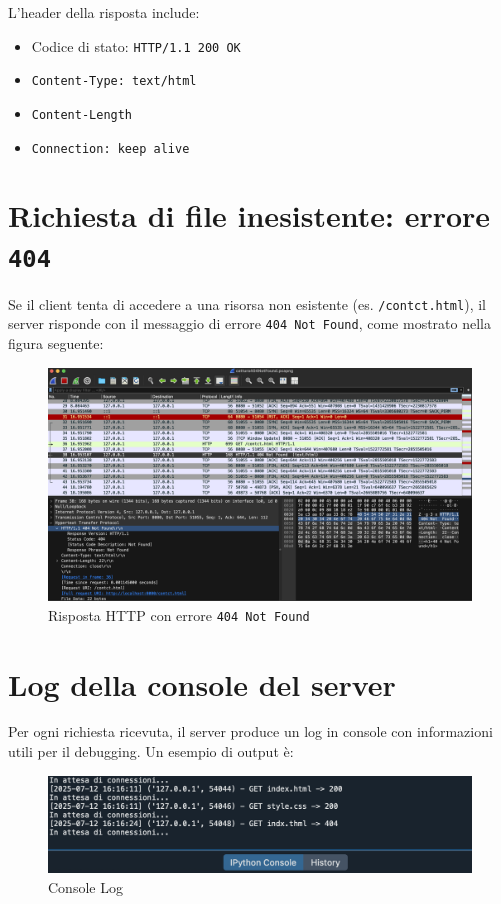 \documentclass[a4paper,12pt]{report}
\begin{document}
L’header della risposta include:
\begin{itemize}
    \item Codice di stato: \texttt{HTTP/1.1 200 OK}
    \item \texttt{Content-Type: text/html}
    \item \texttt{Content-Length}
    \item \texttt{Connection: keep alive}
\end{itemize}

\section{Richiesta di file inesistente: errore \texttt{404}}

Se il client tenta di accedere a una risorsa non esistente (es. \texttt{/contct.html}), il server risponde con il messaggio di errore \texttt{404 Not Found}, come mostrato nella figura seguente:

\begin{figure}[H]
    \centering
    \includegraphics[width=1.0\textwidth]{Images/404NotFound.png}
    \caption{Risposta HTTP con errore \texttt{404 Not Found}}
\end{figure}

\section{Log della console del server}

Per ogni richiesta ricevuta, il server produce un log in console con informazioni utili per il debugging. Un esempio di output è:
\begin{figure}[H]
    \centering
    \includegraphics[width=1.0\textwidth]{Images/consoleLog.png}
    \caption{Console Log}
\end{figure}
\end{document}
